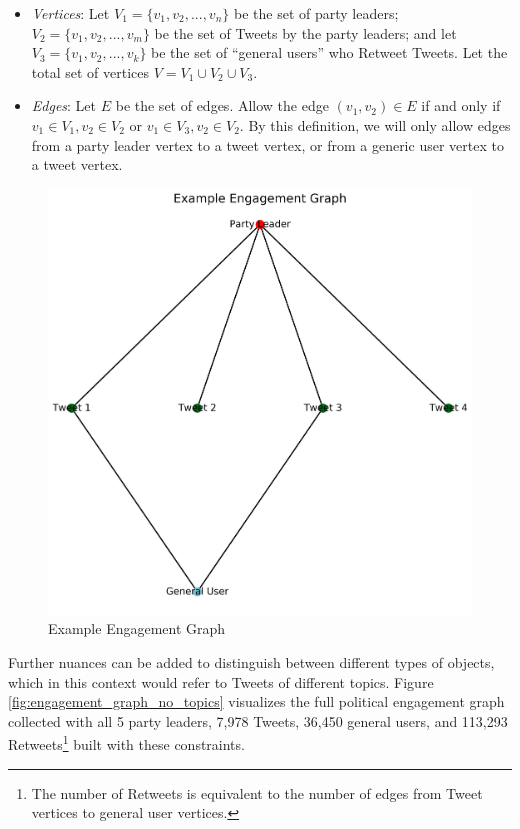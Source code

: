 \begin{itemize}
  \item \emph{Vertices}: Let $V_{1}=\{v_{1},v_{2},...,v_{n}\}$ be the set of
  party leaders; $V_{2}=\{v_{1},v_{2},...,v_{m}\}$ be the set of Tweets by the
  party leaders; and let
  $V_{3}=\{v_{1},v_{2},...,v_{k}\}$ be the set of ``general users'' who
  Retweet Tweets. Let the total set of vertices $V=V_{1}\cup V_{2}\cup V_{3}$.
  
  \item \emph{Edges}: Let $E$ be the set of edges. Allow the edge $(v_{1},
  v_{2})\in E$ if and only if $v_{1}\in V_{1}, v_{2}\in V_{2}$ or $v_{1}\in
  V_{3}, v_{2}\in V_{2}$. By this definition, we will only allow edges from a
  party leader vertex to a tweet vertex, or from a generic user vertex to a
  tweet vertex.
\end{itemize}

\begin{figure}[h!]
  \centering
  \includegraphics[scale=0.2]{figures/ex_engagement_graph}
  \caption[Example Engagement Graph]{Example Engagement Graph}
  \label{fig:ex_engagement_graph}
\end{figure}

Further nuances can be added to distinguish between different types of objects,
which in this context would refer to Tweets of different topics. Figure
\ref{fig:engagement_graph_no_topics}  visualizes the full political engagement
graph collected with all 5 party leaders, 7,978 Tweets, 36,450 general users,
and 113,293 Retweets\footnote{The number of Retweets is equivalent to the number
of edges from Tweet vertices to general user vertices.} built with these constraints.


